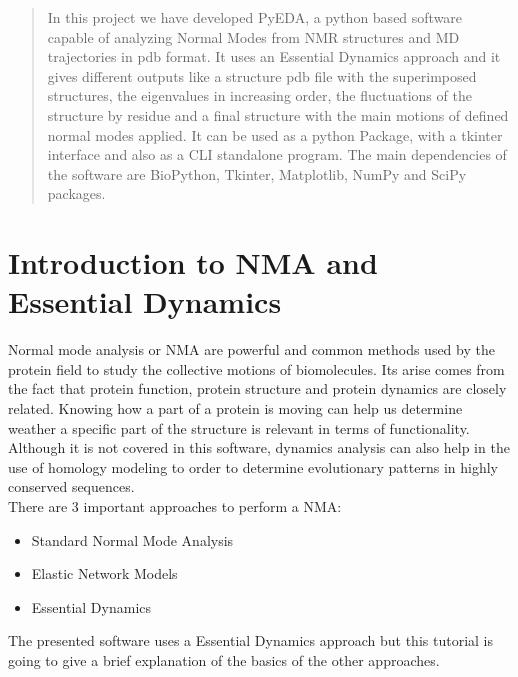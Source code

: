 \documentclass[12pt]{article}
\begin{document}
\maketitle

\begin{abstract}
In this project we have developed PyEDA, a python based software capable of analyzing Normal Modes from NMR structures and MD trajectories in pdb format. It uses an Essential Dynamics approach and it gives different outputs like a structure pdb file with the superimposed structures, the eigenvalues in increasing order, the fluctuations of the structure by residue and a final structure with the main motions of defined normal modes applied. It can be used as a python Package,  with a tkinter interface and also as a CLI standalone program. The main dependencies of the software are BioPython\citep{Cock2009}, Tkinter, Matplotlib\citep{Hunter2007}, NumPy and SciPy\citep{VanderWalt2011} packages.
\end{abstract}

\tableofcontents


\section{Introduction to NMA and Essential Dynamics}

Normal mode analysis or NMA are powerful and common methods used by the protein field to study the collective motions of biomolecules. Its arise comes from the fact that protein function, protein structure and protein dynamics are closely related. Knowing how a part of a protein is moving can help us determine weather a specific part of the structure is relevant in terms of functionality. Although it is not covered in this software, dynamics analysis can also help in the use of homology modeling to  order to determine evolutionary patterns in highly conserved sequences.\\ 

There are 3 important approaches to perform a NMA:

\begin{itemize}
\item Standard Normal Mode Analysis
\item Elastic Network Models
\item Essential Dynamics
\end{itemize}

The presented software uses a Essential Dynamics approach but this tutorial is going to give a brief explanation of the basics of the other approaches.\citep{Hayward2008}
\end{document}
